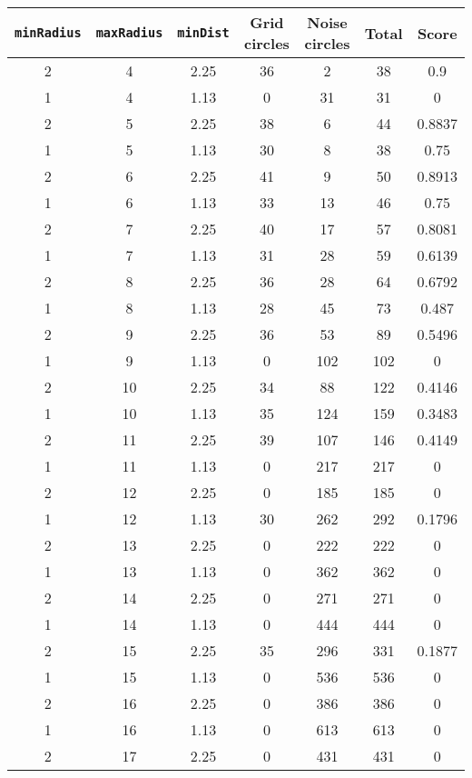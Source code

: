 \documentclass[letterpaper, 12pt]{article}
\begin{document}
\begin{longtable}{|c|c|c|c|c|c|c|}
\hline
\textbf{\texttt{minRadius}} & \textbf{\texttt{maxRadius}} & \textbf{\texttt{minDist}} & \textbf{Grid circles} & \textbf{Noise circles} & \textbf{Total} & \textbf{Score} \\
\hline
2 & 4 & 2.25 & 36 & 2 & 38 & 0.9 \\
\hline
1 & 4 & 1.13 & 0 & 31 & 31 & 0 \\
\hline
2 & 5 & 2.25 & 38 & 6 & 44 & 0.8837 \\
\hline
1 & 5 & 1.13 & 30 & 8 & 38 & 0.75 \\
\hline
2 & 6 & 2.25 & 41 & 9 & 50 & 0.8913 \\
\hline
1 & 6 & 1.13 & 33 & 13 & 46 & 0.75 \\
\hline
2 & 7 & 2.25 & 40 & 17 & 57 & 0.8081 \\
\hline
1 & 7 & 1.13 & 31 & 28 & 59 & 0.6139 \\
\hline
2 & 8 & 2.25 & 36 & 28 & 64 & 0.6792 \\
\hline
1 & 8 & 1.13 & 28 & 45 & 73 & 0.487 \\
\hline
2 & 9 & 2.25 & 36 & 53 & 89 & 0.5496 \\
\hline
1 & 9 & 1.13 & 0 & 102 & 102 & 0 \\
\hline
2 & 10 & 2.25 & 34 & 88 & 122 & 0.4146 \\
\hline
1 & 10 & 1.13 & 35 & 124 & 159 & 0.3483 \\
\hline
2 & 11 & 2.25 & 39 & 107 & 146 & 0.4149 \\
\hline
1 & 11 & 1.13 & 0 & 217 & 217 & 0 \\
\hline
2 & 12 & 2.25 & 0 & 185 & 185 & 0 \\
\hline
1 & 12 & 1.13 & 30 & 262 & 292 & 0.1796 \\
\hline
2 & 13 & 2.25 & 0 & 222 & 222 & 0 \\
\hline
1 & 13 & 1.13 & 0 & 362 & 362 & 0 \\
\hline
2 & 14 & 2.25 & 0 & 271 & 271 & 0 \\
\hline
1 & 14 & 1.13 & 0 & 444 & 444 & 0 \\
\hline
2 & 15 & 2.25 & 35 & 296 & 331 & 0.1877 \\
\hline
1 & 15 & 1.13 & 0 & 536 & 536 & 0 \\
\hline
2 & 16 & 2.25 & 0 & 386 & 386 & 0 \\
\hline
1 & 16 & 1.13 & 0 & 613 & 613 & 0 \\
\hline
2 & 17 & 2.25 & 0 & 431 & 431 & 0 \\

\end{longtable}
\end{document}
